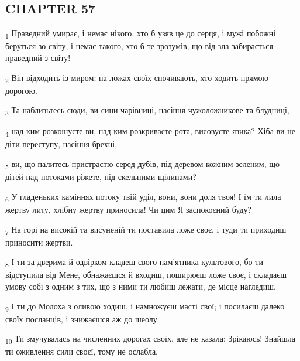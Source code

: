 \subsection{CHAPTER 57}
\begin{tcolorbox}
\textsubscript{1} Праведний умирає, і немає нікого, хто б узяв це до серця, і мужі побожні беруться зо світу, і немає такого, хто б те зрозумів, що від зла забирається праведний з світу!
\end{tcolorbox}
\begin{tcolorbox}
\textsubscript{2} Він відходить із миром; на ложах своїх спочивають, хто ходить прямою дорогою.
\end{tcolorbox}
\begin{tcolorbox}
\textsubscript{3} Та наблизьтесь сюди, ви сини чарівниці, насіння чужоложникове та блудниці,
\end{tcolorbox}
\begin{tcolorbox}
\textsubscript{4} над ким розкошуєте ви, над ким розкриваєте рота, висовуєте язика? Хіба ви не діти переступу, насіння брехні,
\end{tcolorbox}
\begin{tcolorbox}
\textsubscript{5} ви, що палитесь пристрастю серед дубів, під деревом кожним зеленим, що дітей над потоками ріжете, під скельними щілинами?
\end{tcolorbox}
\begin{tcolorbox}
\textsubscript{6} У гладеньких каміннях потоку твій уділ, вони, вони доля твоя! І їм ти лила жертву литу, хлібну жертву приносила! Чи цим Я заспокоєний буду?
\end{tcolorbox}
\begin{tcolorbox}
\textsubscript{7} На горі на високій та висуненій ти поставила ложе своє, і туди ти приходиш приносити жертви.
\end{tcolorbox}
\begin{tcolorbox}
\textsubscript{8} І ти за дверима й одвірком кладеш свого пам'ятника культового, бо ти відступила від Мене, обнажаєшся й входиш, поширюєш ложе своє, і складаєш умову собі з одним з тих, що з ними ти любиш лежати, де місце нагледиш.
\end{tcolorbox}
\begin{tcolorbox}
\textsubscript{9} І ти до Молоха з оливою ходиш, і намножуєш масті свої; і посилаєш далеко своїх посланців, і знижаєшся аж до шеолу.
\end{tcolorbox}
\begin{tcolorbox}
\textsubscript{10} Ти змучувалась на численних дорогах своїх, але не казала: Зрікаюсь! Знайшла ти оживлення сили своєї, тому не ослабла.
\end{tcolorbox}
